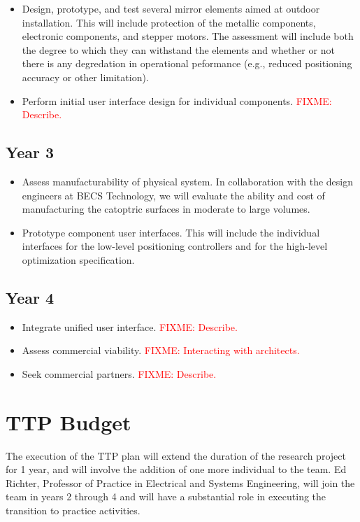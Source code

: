 \documentclass[11pt]{article}
\newcommand{\FIXME}[1]{\textcolor{red}{FIXME: #1}}
\begin{document}
\begin{itemize}

\item Design, prototype, and test several mirror elements aimed at
outdoor installation. This will include protection of the metallic components,
electronic components, and stepper motors.  The assessment will include
both the degree to which they can withstand the elements and whether or
not there is any degredation in operational peformance (e.g., reduced
positioning accuracy or other limitation).

\item Perform initial user interface design for individual components.
\FIXME{Describe.}

\end{itemize}

\subsection{Year 3}

\begin{itemize}

\item Assess manufacturability of physical system.  In collaboration with
the design engineers at BECS Technology, 
we will evaluate the ability and cost of manufacturing the catoptric
surfaces in moderate to large volumes.

\item Prototype component user interfaces. This will include the individual
interfaces for the low-level positioning controllers 
and for the high-level optimization specification.

\end{itemize}

\subsection{Year 4}

\begin{itemize}

\item Integrate unified user interface. \FIXME{Describe.}

\item Assess commercial viability. \FIXME{Interacting with architects.}

\item Seek commercial partners. \FIXME{Describe.}

\end{itemize}

\section{TTP Budget}

The execution of the TTP plan will extend the duration of the research
project for 1 year, and will involve the addition of one more individual
to the team.  Ed Richter, Professor of Practice in Electrical and Systems
Engineering, will join the team in years 2 through 4 and will have a
substantial role in executing the transition to practice activities.
\end{document}
